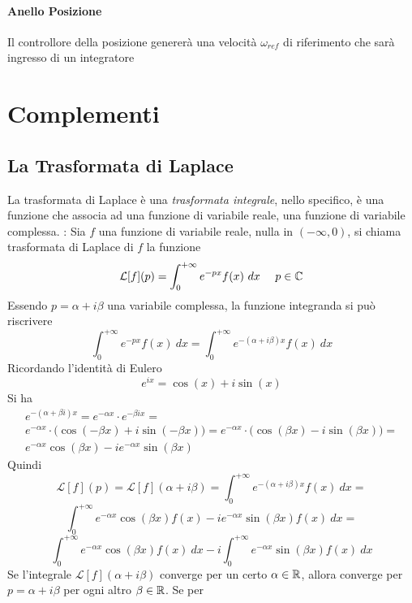 \documentclass[10pt, letterpaper]{report}
\begin{document}
\subsubsection{Anello Posizione}
Il controllore della posizione genererà una velocità $\omega_{ref}$ di riferimento che sarà ingresso di un integratore















\chapter{Complementi}
\section{La Trasformata di Laplace} 
La trasformata di Laplace è una \textit{trasformata integrale}, nello specifico, è una 
funzione che associa ad una funzione di variabile reale, una funzione di variabile 
complessa.\acc 
{} : Sia $f$ una funzione di variabile reale, nulla 
in $(-\infty,0)$, si chiama trasformata di Laplace di $f$ la funzione 
$$ \mathcal{L}[f](p)=\int_0^{+\infty} e^{-px}f(x)\ dx \ \ \ \ p\in \C$$
Essendo $p = \alpha + i\beta$ una variabile complessa, la funzione integranda si può riscrivere 
$$\int_0^{+\infty} e^{-px}f(x)\ dx = 
\int_0^{+\infty} e^{-(\alpha + i\beta)x}f(x)\ dx$$
Ricordando l'identità di Eulero $$ e^{ix}=\cos(x)+i\sin(x)$$
Si ha 
\begin{eqnarray}
    e^{-(\alpha + \beta i)x} = e^{-\alpha x}\cdot e^{-\beta i x} =\\ 
    e^{-\alpha x}\cdot \Big(
    \cos(-\beta x)+ i \sin(-\beta x)    
    \Big) = e^{-\alpha x}\cdot \Big(
        \cos(\beta x)- i \sin(\beta x)    
        \Big) = \\ 
        e^{-\alpha x}\cos(\beta x)- i e^{-\alpha x}\sin(\beta x)
\end{eqnarray}
Quindi $$ \mathcal{L}[f](p)=\mathcal{L}[f](\alpha + i\beta)=
\int_0^{+\infty} e^{-(\alpha + i\beta)x}f(x)\ dx=
$$
$$
\int_0^{+\infty} e^{-\alpha x}\cos(\beta x)f(x)-ie^{-\alpha x}\sin(\beta x)f(x)\ dx =$$
$$ 
\int_0^{+\infty} e^{-\alpha x}\cos(\beta x)f(x)\ dx-i\int_0^{+\infty}e^{-\alpha x}\sin(\beta x)f(x)\ dx
$$
Se l'integrale $\mathcal{L}[f](\alpha + i\beta)$ converge per un certo
 $\alpha \in {\mathbb R}$, allora converge per $p = \alpha + i\beta$ per ogni altro $\beta \in {\mathbb R}$. Se per 
\end{document}
